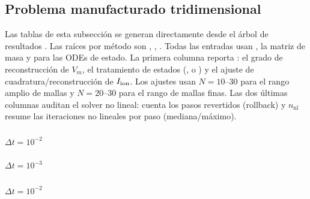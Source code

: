\subsection{Problema manufacturado tridimensional}
\label{sec:es-results-3d}
Las tablas de esta subsección se generan directamente desde el árbol de
resultados . Las raíces por método son , , .
Todas las entradas usan , la matriz de masa
 y  para las ODEs de estado.
La primera columna reporta : el grado de reconstrucción
de $V_m$, el tratamiento de estados (,  o ) y el
ajuste de cuadratura/reconstrucción de $I_{\mathrm{ion}}$.
Los ajustes usan $N=10$--$30$ para el rango amplio de mallas y
$N=20$--$30$ para el rango de mallas finas.
Las dos últimas columnas auditan el solver no lineal:  cuenta los
pasos revertidos (rollback) y $n_{\mathrm{nl}}$ resume las iteraciones no
lineales por paso (mediana/máximo).

\subsubsection{}
\paragraph{$\Delta t=10^{-2}$}

\paragraph{$\Delta t=10^{-3}$}


\subsubsection{}
\paragraph{$\Delta t=10^{-2}$}

